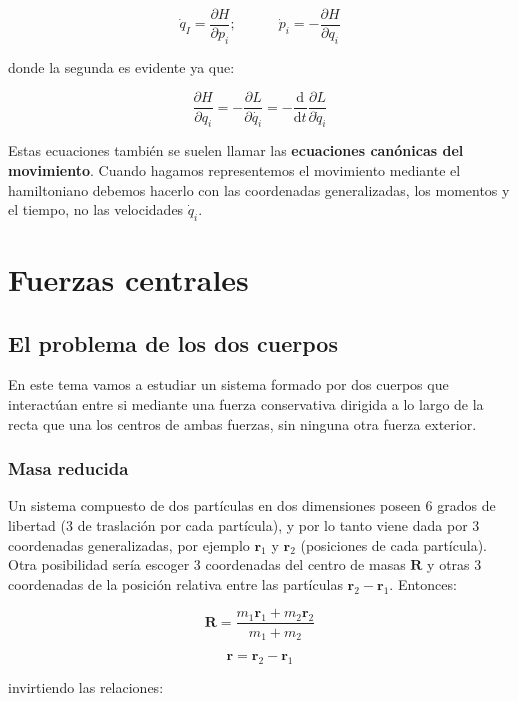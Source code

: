 \documentclass[12pt,a4paper]{book}
\newcommand{\parciales}[2]{\frac{\partial #1}{\partial #2}}
\newcommand{\D}{\mathrm{d}}
\newcommand{\tquad}{\quad \quad \quad}
\newcommand{\rn}{\mathbf{r}}
\newcommand{\Rn}{\mathbf{R}}
\begin{document}
\begin{equation}
\dot{q}_I = \parciales{H}{p_i}; \tquad \dot{p}_i = - \parciales{H}{q_i}
\end{equation}

donde la segunda es evidente ya que:

$$ \parciales{H}{q_i} = - \parciales{L}{\dot{q_i}} = - \dfrac{\D}{\D t} \parciales{L}{\dot{q}_i} $$

Estas ecuaciones también se suelen llamar las \textbf{ecuaciones canónicas del movimiento}. Cuando hagamos representemos el movimiento mediante el hamiltoniano debemos hacerlo con las coordenadas generalizadas, los momentos y el tiempo, no las velocidades $\dot{q}_i$.




\chapter{Fuerzas centrales}

\section{El problema de los dos cuerpos}

En este tema vamos a estudiar un sistema formado por dos cuerpos que interactúan entre si mediante una fuerza conservativa dirigida a lo largo de la recta que una los centros de ambas fuerzas, sin ninguna otra fuerza exterior. 

\subsection{Masa reducida}

Un sistema compuesto de dos partículas en dos dimensiones poseen 6 grados de libertad (3 de traslación por cada partícula), y por lo tanto viene dada por 3 coordenadas generalizadas, por ejemplo $\rn_1$ y $\rn_2$ (posiciones de cada partícula). Otra posibilidad sería escoger 3 coordenadas del centro de masas $\Rn$ y otras 3 coordenadas de la posición relativa entre las partículas $\rn_2 - \rn_1$. Entonces:

\begin{equation}
\Rn = \dfrac{m_1 \rn_1 + m_2 \rn_2}{m_1 + m_2}
\end{equation}

\begin{equation}
\rn = \rn_2 - \rn_1
\end{equation}

invirtiendo las relaciones:
\end{document}
